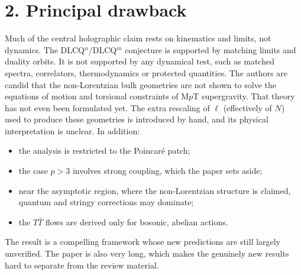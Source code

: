 \documentclass[11pt]{article}
\begin{document}
\section*{2. Principal drawback}
Much of the central holographic claim rests on kinematics and limits, not dynamics. The
DLCQ$^n$/DLCQ$^m$ conjecture is supported by matching limits and duality orbits. It is
not supported by any dynamical test, such as matched spectra, correlators, thermodynamics
or protected quantities. The authors are candid that the non-Lorentzian bulk geometries
are not shown to solve the equations of motion and torsional constraints of M$p$T
supergravity. That theory has not even been formulated yet. The extra rescaling of $\ell$
(effectively of $N$) used to produce these geometries is introduced by hand, and its
physical interpretation is unclear. In addition:
\begin{itemize}
\item the analysis is restricted to the Poincar\'e patch;
\item the case $p>3$ involves strong coupling, which the paper sets aside;
\item near the asymptotic region, where the non-Lorentzian structure is claimed,
quantum and stringy corrections may dominate;
\item the $T\bar T$ flows are derived only for bosonic, abelian actions.
\end{itemize}
The result is a compelling framework whose new predictions are still largely unverified.
The paper is also very long, which makes the genuinely new results hard to separate from
the review material.
\end{document}

